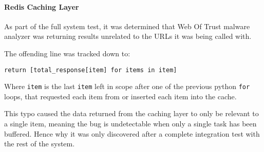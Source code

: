 \paragraph{Redis Caching Layer}
As part of the full system test, it was determined that Web Of Trust malware analyzer was returning results unrelated to the URLs it was being called with.

The offending line was tracked down to:

\verb`return [total_response[item] for items in item]`

Where \verb`item` is the last \verb`item` left in scope after one of the previous python \verb`for` loops, that requested each item from or inserted each item into the cache.

This typo caused the data returned from the caching layer to only be relevant to a single item, meaning the bug is undetectable when only a single task has been buffered. Hence why it was only discovered after a complete integration test with the rest of the system.


